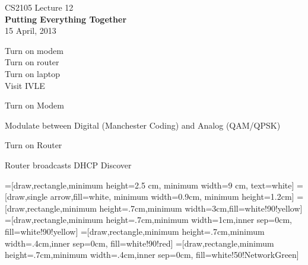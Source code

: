 \begin{cf}{
CS2105 Lecture 12\\
\large
\textbf{Putting Everything Together\\[10pt]}
\normalsize
15 April, 2013
}
\end{cf}



\begin{cf}{
}
\end{cf}

\begin{cf}{
	Turn on modem\\
	Turn on router\\
	Turn on laptop\\
	Visit IVLE\\
}
\end{cf}
	
\begin{cf}{
	Turn on Modem
}
\end{cf}

\begin{cf}{
	Modulate between Digital (Manchester Coding) and Analog (QAM/QPSK)
}
\end{cf}

\begin{cf}{
	Turn on Router
}
\end{cf}

\begin{cf}{
	Router broadcasts DHCP Discover
}
\end{cf}

=[draw,rectangle,minimum height=2.5 cm, minimum width=9 cm, text=white]
=[draw,single arrow,fill=white, minimum width=0.9cm, minimum height=1.2cm]
=[draw,rectangle,minimum height=.7cm,minimum width=3cm,fill=white!90!yellow]
=[draw,rectangle,minimum height=.7cm,minimum width=1cm,inner sep=0cm, fill=white!90!yellow]
=[draw,rectangle,minimum height=.7cm,minimum width=.4cm,inner sep=0cm, fill=white!90!red]
=[draw,rectangle,minimum height=.7cm,minimum width=.4cm,inner sep=0cm, fill=white!50!NetworkGreen]

